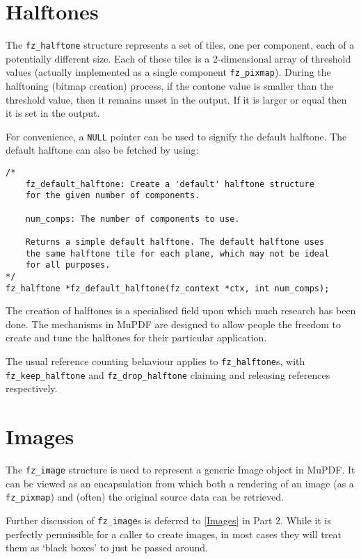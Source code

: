 \documentclass[oneside]{book}
\newcommand{\rjwref}[1] {\autoref{#1} \nameref{#1}}
\begin{document}
\section{Halftones}
\label{Halftones}

The \texttt{fz\_halftone} structure represents a set of tiles, one per component, each of a potentially different size. Each of these tiles is  a 2-dimensional array of threshold values (actually implemented as a single component \texttt{fz\_pixmap}). During the halftoning (bitmap creation) process, if the contone value is smaller than the threshold value, then it remains unset in the output. If it is larger or equal then it is set in the output.

For convenience, a \texttt{NULL} pointer can be used to signify the default halftone. The default halftone can also be fetched by using:

\begin{lstlisting}
/*
	fz_default_halftone: Create a 'default' halftone structure
	for the given number of components.

	num_comps: The number of components to use.

	Returns a simple default halftone. The default halftone uses
	the same halftone tile for each plane, which may not be ideal
	for all purposes.
*/
fz_halftone *fz_default_halftone(fz_context *ctx, int num_comps);
\end{lstlisting}

The creation of halftones is a specialised field upon which much research has been done. The mechanisms in MuPDF are designed to allow people the freedom to create and tune the halftones for their particular application.

The usual reference counting behaviour applies to \texttt{fz\_halftone}s, with \texttt{fz\_keep\_halftone} and \texttt{fz\_drop\_halftone} claiming and releasing references respectively.


\section{Images}

The \texttt{fz\_image} structure is used to represent a generic Image object in MuPDF. It can be viewed as an encapsulation from which both a rendering of an image (as a \texttt{fz\_pixmap}) and (often) the original source data can be retrieved.

Further discussion of \texttt{fz\_image}s is deferred to \rjwref{Images} in Part 2. While it is perfectly permissible for a caller to create images, in most cases they will treat them as `black boxes' to just be passed around.
\end{document}
